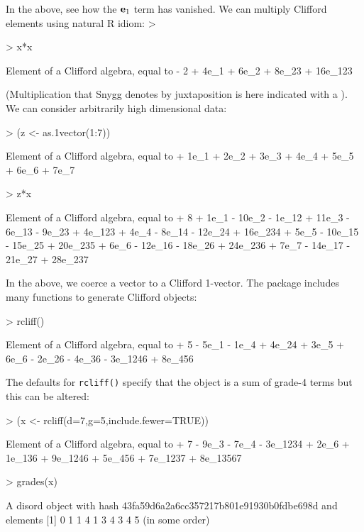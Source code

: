 \documentclass{birkjour}
\theoremstyle{definition}
\theoremstyle{remark}
\numberwithin{equation}{section}
\begin{document}
In the above, see how the ${\bf e}_{1}$ term has vanished.  We can
multiply Clifford elements using natural R idiom:
>
\begin{Schunk}
\begin{Sinput}
> x*x
\end{Sinput}
\begin{Soutput}
Element of a Clifford algebra, equal to
- 2 + 4e_1 + 6e_2 + 8e_23 + 16e_123
\end{Soutput}
\end{Schunk}

(Multiplication that Snygg denotes by juxtaposition is here indicated
with a {\tt *}).  We can consider arbitrarily high dimensional data:

\begin{Schunk}
\begin{Sinput}
> (z <- as.1vector(1:7))
\end{Sinput}
\begin{Soutput}
Element of a Clifford algebra, equal to
+ 1e_1 + 2e_2 + 3e_3 + 4e_4 + 5e_5 + 6e_6 + 7e_7
\end{Soutput}
\begin{Sinput}
> z*x
\end{Sinput}
\begin{Soutput}
Element of a Clifford algebra, equal to
+ 8 + 1e_1 - 10e_2 - 1e_12 + 11e_3 - 6e_13 - 9e_23 + 4e_123 + 4e_4 - 8e_14 -
12e_24 + 16e_234 + 5e_5 - 10e_15 - 15e_25 + 20e_235 + 6e_6 - 12e_16 - 18e_26 +
24e_236 + 7e_7 - 14e_17 - 21e_27 + 28e_237
\end{Soutput}
\end{Schunk}

In the above, we coerce a vector to a Clifford 1-vector.  The package
includes many functions to generate Clifford objects:

\begin{Schunk}
\begin{Sinput}
> rcliff()
\end{Sinput}
\begin{Soutput}
Element of a Clifford algebra, equal to
+ 5 - 5e_1 - 1e_4 + 4e_24 + 3e_5 + 6e_6 - 2e_26 - 4e_36 - 3e_1246 + 8e_456
\end{Soutput}
\end{Schunk}

The defaults for {\tt rcliff()} specify that the object is a sum of
grade-4 terms but this can be altered:

\begin{Schunk}
\begin{Sinput}
> (x <- rcliff(d=7,g=5,include.fewer=TRUE))
\end{Sinput}
\begin{Soutput}
Element of a Clifford algebra, equal to
+ 7 - 9e_3 - 7e_4 - 3e_1234 + 2e_6 + 1e_136 + 9e_1246 + 5e_456 + 7e_1237 +
8e_13567
\end{Soutput}
\begin{Sinput}
> grades(x)
\end{Sinput}
\begin{Soutput}
A disord object with hash 43fa59d6a2a6cc357217b801e91930b0fdbe698d and elements
 [1] 0 1 1 4 1 3 4 3 4 5
(in some order)
\end{Soutput}
\end{Schunk}
\end{document}
